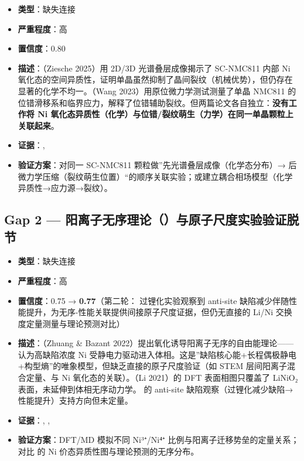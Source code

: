 \documentclass[12pt,a4paper]{ctexart}
\providecommand{\tightlist}{%
  \setlength{\itemsep}{0pt}\setlength{\parskip}{0pt}}
\begin{document}
\begin{itemize}
\tightlist
\item
  \textbf{类型}：缺失连接
\item
  \textbf{严重程度}：高
\item
  \textbf{置信度}：0.80
\item
  \textbf{描述}：\cite{p24}（Ziesche 2025）用 2D/3D 光谱叠层成像揭示了 SC-NMC811 内部 Ni 氧化态的空间异质性，证明单晶虽然抑制了晶间裂纹（机械优势），但仍存在显著的化学不均一。\cite{p25}（Wang 2023）用原位微力学测试测量了单晶 NMC811 的位错滑移系和临界应力，解释了位错辅助裂纹。但两篇论文各自独立：\textbf{没有工作将 Ni 氧化态异质性（化学）与位错/裂纹萌生（力学）在同一单晶颗粒上关联起来}。
\item
  \textbf{证据}：\cite{p24}, \cite{p25}
\item
  \textbf{验证方案}：对同一 SC-NMC811 颗粒做''先光谱叠层成像（化学态分布）→ 后微力学压缩（裂纹萌生位置）``的顺序关联实验；或建立耦合相场模型（化学异质性→应力源→裂纹）。
\end{itemize}

\subsection{Gap 2 --- 阳离子无序理论（\cite{p27}）与原子尺度实验验证脱节}\label{gap:gap-2-ux9633ux79bbux5b50ux65e0ux5e8fux7406ux8bbap27ux4e0eux539fux5b50ux5c3aux5ea6ux5b9eux9a8cux9a8cux8bc1ux8131ux8282}

\begin{itemize}
\tightlist
\item
  \textbf{类型}：缺失连接
\item
  \textbf{严重程度}：高
\item
  \textbf{置信度}：0.75 → \textbf{0.77}（第二轮：\cite{p44} 过锂化实验观察到 anti-site 缺陷减少伴随性能提升，为无序-性能关联提供间接原子尺度证据，但仍无直接的 Li/Ni 交换度定量测量与理论预测对比）
\item
  \textbf{描述}：\cite{p27}（Zhuang \& Bazant 2022）提出氧化诱导阳离子无序的自由能理论------认为高缺陷浓度 Ni 受静电力驱动进入体相。这是''缺陷核心能+长程偶极静电+构型熵''的唯象模型，但缺乏直接的原子尺度验证（如 STEM 层间阳离子混合定量、与 Ni 氧化态的关联）。\cite{p32}（Li 2021）的 DFT 表面相图只覆盖了 LiNiO₂ 表面，未延伸到体相无序动力学。\cite{p44} 的 anti-site 缺陷观察（过锂化减少缺陷→性能提升）支持方向但未定量。
\item
  \textbf{证据}：\cite{p27}, \cite{p32}, \cite{p44}
\item
  \textbf{验证方案}：DFT/MD 模拟不同 Ni³⁺/Ni⁴⁺ 比例与阳离子迁移势垒的定量关系；对比 \cite{p24} 的 Ni 价态异质性图与理论预测的无序分布。
\end{itemize}
\end{document}
